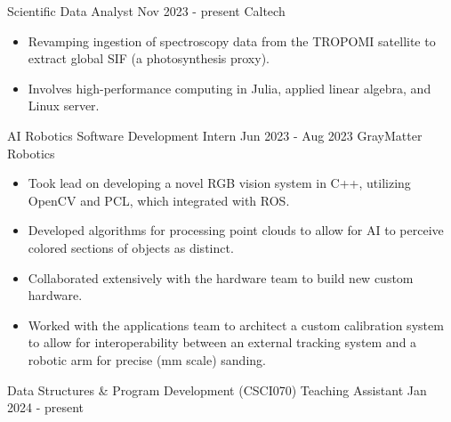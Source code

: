 \documentclass[9pt]{resume}
\begin{document}
    
    \vspace{0.5cm}

    \begin{experiencelist}
        \experience
            {Scientific Data Analyst}
            {Nov 2023 - present}
            {Caltech}
            {\begin{itemize}[noitemsep, topsep=1pt]
                \item Revamping ingestion of spectroscopy data from the TROPOMI satellite to extract global SIF (a photosynthesis proxy). 
                \item Involves high-performance computing in Julia, applied linear algebra, and Linux server.
            \end{itemize}}
        \experience 
            {AI Robotics Software Development Intern}
            {Jun 2023 - Aug 2023}
            {GrayMatter Robotics}
            {\begin{itemize}[noitemsep, topsep=1pt]
                \item Took lead on developing a novel RGB vision system in C++, utilizing OpenCV and PCL, which integrated with ROS.
                \item Developed algorithms for processing point clouds to allow for AI to perceive colored sections of objects as distinct.
                \item Collaborated extensively with the hardware team to build new custom hardware.
                \item Worked with the applications team to architect a custom calibration system to allow for interoperability between an external tracking system and a robotic arm for precise (mm scale) sanding.
            \end{itemize}}
        \experience
            {Data Structures \& Program Development (CSCI070) Teaching Assistant}
            {Jan 2024 - present}

\end{experiencelist}
\end{document}
